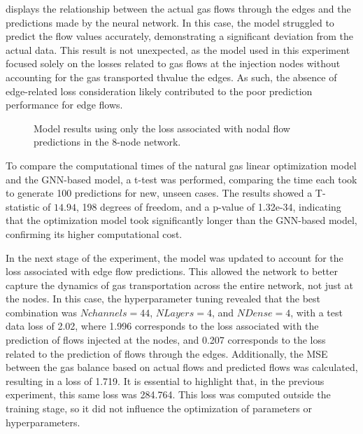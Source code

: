  displays the relationship between the actual gas flows through the edges and the predictions made by the neural network. In this case, the model struggled to predict the flow values accurately, demonstrating a significant deviation from the actual data. This result is not unexpected, as the model used in this experiment focused solely on the losses related to gas flows at the injection nodes without accounting for the gas transported thvalue the edges. As such, the absence of edge-related loss consideration likely contributed to the poor prediction performance for edge flows.


\begin{figure}
    \centering
    \setlength{}        
    \setlength{} 
    
    \caption{Model results using only the loss associated with nodal flow predictions in the 8-node network.}
    \label{fig:dummy_base_results}
\end{figure}



To compare the computational times of the natural gas linear optimization model and the GNN-based model, a t-test was performed, comparing the time each took to generate 100 predictions for new, unseen cases. The results showed a T-statistic of $14.94$, 198 degrees of freedom, and a p-value of 1.32e-34, indicating that the optimization model took significantly longer than the GNN-based model, confirming its higher computational cost.


In the next stage of the experiment, the model was updated to account for the loss associated with edge flow predictions. This allowed the network to better capture the dynamics of gas transportation across the entire network, not just at the nodes. In this case, the hyperparameter tuning revealed that the best combination was $N channels=44$, $N Layers=4$, and $N Dense=4$, with a test data loss of 2.02, where 1.996 corresponds to the loss associated with the prediction of flows injected at the nodes, and 0.207 corresponds to the loss related to the prediction of flows through the edges. Additionally, the MSE between the gas balance based on actual flows and predicted flows was calculated, resulting in a loss of 1.719. It is essential to highlight that, in the previous experiment, this same loss was 284.764. This loss was computed outside the training stage, so it did not influence the optimization of parameters or hyperparameters.


